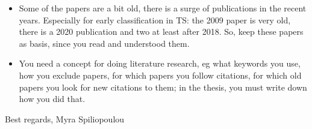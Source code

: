 \documentclass{article}
\newcommand{\cmark}{\ding{51}}%
\newcommand{\done}{\rlap{$\square$}{\raisebox{2pt}{\large\hspace{1pt}\cmark}}%
\hspace{-2.5pt}}
\begin{document}
\begin{itemize}
\begin{itemize}
\begin{todolist}
				\end{todolist}
			\item Some of the papers are a bit old, there is a surge of publications in the recent years. Especially for early classification in TS: the 2009 paper is very old, there is a 2020 publication and two at least after 2018. So, keep these papers as basis, since you read and understood them.
			\item You need a concept for doing literature research, eg what keywords you use, how you exclude papers, for which papers you follow citations, for which old papers you look for new citations to them; in the thesis, you must write down how you did that.
		\end{itemize}
\end{itemize}

Best regards,
Myra Spiliopoulou
\end{document}
